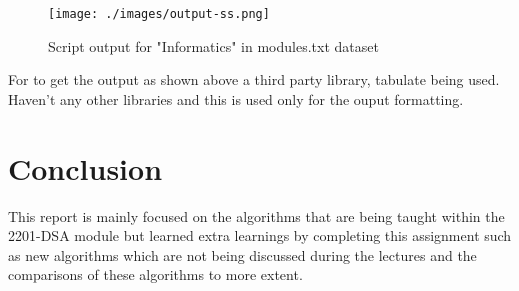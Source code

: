 \documentclass[12pt]{article}
\begin{document}
\begin{figure}[h]
\centering
\texttt{[image: ./images/output-ss.png]}
\caption{Script output for "Informatics" in modules.txt dataset}\label{output1}
\end{figure}

For to get the output as shown above a third party library, tabulate being used. Haven't any other libraries and this is used only for the ouput formatting.

\newpage

\section{Conclusion}
This report is mainly focused on the algorithms that are being taught within the 2201-DSA module but learned extra learnings by completing this assignment such as new algorithms which are not being discussed during the lectures and the comparisons of these algorithms to more extent.

\newpage

\printbibliography %
\end{document}
